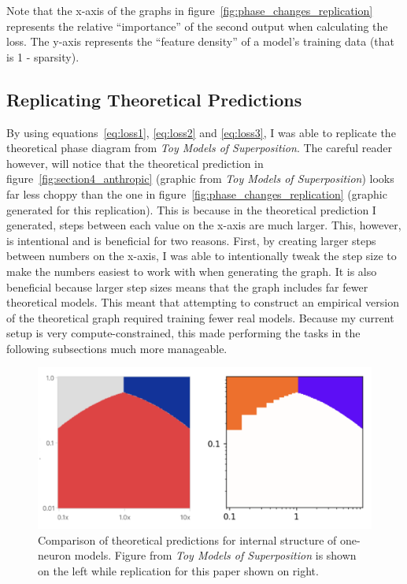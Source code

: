\documentclass{article} %
\begin{document}
Note that the x-axis of the graphs in figure~\ref{fig:phase_changes_replication}
represents the relative ``importance'' of the second output when calculating the
loss. The y-axis represents the ``feature density'' of a model's training data
(that is 1 - sparsity).

\subsection{Replicating Theoretical Predictions}

By using equations~\ref{eq:loss1}, \ref{eq:loss2} and \ref{eq:loss3},
I was able to replicate the theoretical phase diagram from
\textit{Toy Models of Superposition}.
The careful reader however, will notice that the theoretical prediction in
figure~\ref{fig:section4_anthropic} (graphic from \textit{Toy Models of 
Superposition}) looks far less choppy than the one in figure~\ref{fig:phase_changes_replication} (graphic
generated for this replication). This is because in the theoretical prediction I 
generated, steps between each value on the x-axis are much larger. This, however, is
intentional and is beneficial for two reasons. First, by creating larger steps 
between numbers on
the x-axis, I was able to intentionally tweak the step size to make the numbers
easiest to work with when generating the graph. It is also beneficial because
larger step sizes means that the graph includes far fewer theoretical
models. This meant that attempting to construct an empirical version of the theoretical graph 
required training fewer real models. Because my current setup is very 
compute-constrained, this made performing the tasks in the following subsections
much more manageable.

\begin{figure}[h]
    \centering
    \includegraphics[width=0.5\linewidth]{phase_changes/images/theoretical_predictions.png}
    \captionsetup{font=footnotesize, width=0.7\linewidth} %
    \caption{
        Comparison of theoretical predictions for internal structure of one-neuron 
        models. Figure from \textit{Toy Models of Superposition} is shown on the 
        left while replication for this paper shown on right. 
    }
    \label{fig:theoretical_preditions}
\end{figure}
\end{document}
